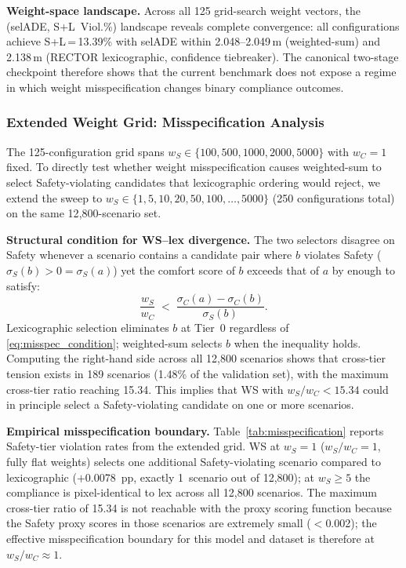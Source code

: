 \noindent\textbf{Weight-space landscape.}
Across all 125 grid-search weight vectors, the (selADE, S+L~Viol.\%) landscape reveals complete convergence: all configurations achieve S+L\,=\,13.39\% with selADE within 2.048--2.049\,m (weighted-sum) and 2.138\,m (RECTOR lexicographic, confidence tiebreaker).  The canonical two-stage checkpoint therefore shows that the current benchmark does not expose a regime in which weight misspecification changes binary compliance outcomes.

\subsubsection{Extended Weight Grid: Misspecification Analysis}
\label{subsubsec:misspecification}

The 125-configuration grid spans $w_S \in \{100, 500, 1000, 2000, 5000\}$ with $w_C{=}1$ fixed.  To directly test whether weight misspecification causes weighted-sum to select Safety-violating candidates that lexicographic ordering would reject, we extend the sweep to $w_S \in \{1, 5, 10, 20, 50, 100, \ldots, 5000\}$ (250 configurations total) on the same 12{,}800-scenario set.

\noindent\textbf{Structural condition for WS--lex divergence.}
The two selectors disagree on Safety whenever a scenario contains a candidate pair where $b$ violates Safety ($\sigma_S(b) > 0 = \sigma_S(a)$) yet the comfort score of $b$ exceeds that of $a$ by enough to satisfy:
\begin{equation}
  \frac{w_S}{w_C} \;<\; \frac{\sigma_C(a) - \sigma_C(b)}{\sigma_S(b)}.
  \label{eq:misspec_condition}
\end{equation}
Lexicographic selection eliminates $b$ at Tier~0 regardless of \eqref{eq:misspec_condition}; weighted-sum selects $b$ when the inequality holds.  Computing the right-hand side across all 12{,}800 scenarios shows that cross-tier tension exists in 189 scenarios (1.48\% of the validation set), with the maximum cross-tier ratio reaching 15.34.  This implies that WS with $w_S/w_C < 15.34$ could in principle select a Safety-violating candidate on one or more scenarios.

\noindent\textbf{Empirical misspecification boundary.}
Table~\ref{tab:misspecification} reports Safety-tier violation rates from the extended grid.  WS at $w_S{=}1$ ($w_S/w_C{=}1$, fully flat weights) selects one additional Safety-violating scenario compared to lexicographic ($+$0.0078~pp, exactly 1~scenario out of 12{,}800); at $w_S{\geq}5$ the compliance is pixel-identical to lex across all 12{,}800 scenarios.  The maximum cross-tier ratio of 15.34 is not reachable with the proxy scoring function because the Safety proxy scores in those scenarios are extremely small ($<$0.002); the effective misspecification boundary for this model and dataset is therefore at $w_S/w_C \approx 1$.

